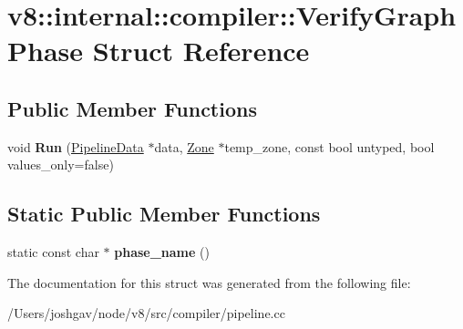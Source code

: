 \hypertarget{structv8_1_1internal_1_1compiler_1_1_verify_graph_phase}{}\section{v8\+:\+:internal\+:\+:compiler\+:\+:Verify\+Graph\+Phase Struct Reference}
\label{structv8_1_1internal_1_1compiler_1_1_verify_graph_phase}
\subsection*{Public Member Functions}
\begin{DoxyCompactItemize}
\item 
void {\bfseries Run} (\hyperlink{classv8_1_1internal_1_1compiler_1_1_pipeline_data}{Pipeline\+Data} $\ast$data, \hyperlink{classv8_1_1internal_1_1_zone}{Zone} $\ast$temp\+\_\+zone, const bool untyped, bool values\+\_\+only=false)\hypertarget{structv8_1_1internal_1_1compiler_1_1_verify_graph_phase_a83d267e62b271fe30a1de9fcb0c09b2a}{}\label{structv8_1_1internal_1_1compiler_1_1_verify_graph_phase_a83d267e62b271fe30a1de9fcb0c09b2a}

\end{DoxyCompactItemize}
\subsection*{Static Public Member Functions}
\begin{DoxyCompactItemize}
\item 
static const char $\ast$ {\bfseries phase\+\_\+name} ()\hypertarget{structv8_1_1internal_1_1compiler_1_1_verify_graph_phase_ac322644eb29ff666d44d2751c109e4c8}{}\label{structv8_1_1internal_1_1compiler_1_1_verify_graph_phase_ac322644eb29ff666d44d2751c109e4c8}

\end{DoxyCompactItemize}


The documentation for this struct was generated from the following file\+:\begin{DoxyCompactItemize}
\item 
/\+Users/joshgav/node/v8/src/compiler/pipeline.\+cc\end{DoxyCompactItemize}
